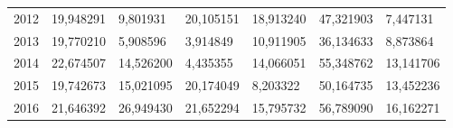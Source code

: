 \begin{table}
\begin{tabular}{p{1cm}p{2cm}p{2cm}p{2cm}p{2cm}p{2cm}p{2cm}}
 2012 &                              19,948291 &         9,801931 & 20,105151 & 18,913240 &                      47,321903 &          7,447131 \\
 2013 &                              19,770210 &         5,908596 &  3,914849 & 10,911905 &                      36,134633 &          8,873864 \\
 2014 &                              22,674507 &        14,526200 &  4,435355 & 14,066051 &                      55,348762 &         13,141706 \\
 2015 &                              19,742673 &        15,021095 & 20,174049 &  8,203322 &                      50,164735 &         13,452236 \\
 2016 &                              21,646392 &        26,949430 & 21,652294 & 15,795732 &                      56,789090 &         16,162271 \\
\bottomrule
\end{tabular}
\end{table}
